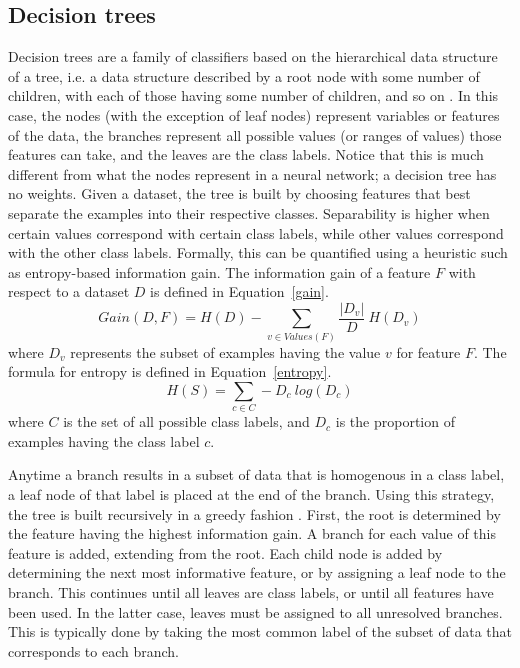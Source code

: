 \subsection{Decision trees}
Decision trees are a family of classifiers based on the hierarchical data structure of a tree, i.e. a data structure described by a root node with some number of children, with each of those having some number of children, and so on \cite{quinlan1986}.  In this case, the nodes (with the exception of leaf nodes) represent variables or features of the data, the branches represent all possible values (or ranges of values) those features can take, and the leaves are the class labels.  Notice that this is much different from what the nodes represent in a neural network; a decision tree has no weights.  Given a dataset, the tree is built by choosing features that best separate the examples into their respective classes.  Separability is higher when certain values correspond with certain class labels, while other values correspond with the other class labels.  Formally, this can be quantified using a heuristic such as entropy-based information gain.  The information gain of a feature $F$ with respect to a dataset $D$ is defined in Equation~\ref{gain}.
%
\begin{equation}
Gain(D, F) = H(D) - \sum_{v \in Values(F)} \frac{|D_v|}{D}\ H(D_v)
\label{gain}
\end{equation}
%
where $D_v$ represents the subset of examples having the value $v$ for feature $F$.  The formula for entropy is defined in Equation~\ref{entropy}.
%
\begin{equation}
H(S) = \sum_{c \in C} -D_c\ log (D_c)
\label{entropy}
\end{equation}
%
where $C$ is the set of all possible class labels, and $D_c$ is the proportion of examples having the class label $c$.

Anytime a branch results in a subset of data that is homogenous in a class label, a leaf node of that label is placed at the end of the branch.  Using this strategy, the tree is built recursively in a greedy fashion \cite{hssina2014}.  First, the root is determined by the feature having the highest information gain.  A branch for each value of this feature is added, extending from the root.  Each child node is added by determining the next most informative feature, or by assigning a leaf node to the branch.  This continues until all leaves are class labels, or until all features have been used.  In the latter case, leaves must be assigned to all unresolved branches.  This is typically done by taking the most common label of the subset of data that corresponds to each branch.

